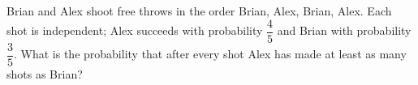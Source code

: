 Brian and Alex shoot free throws in the order Brian, Alex, Brian, Alex. Each shot is independent; Alex succeeds with probability $\dfrac{4}{5}$ and Brian with probability $\dfrac{3}{5}$. What is the probability that after every shot Alex has made at least as many shots as Brian?
